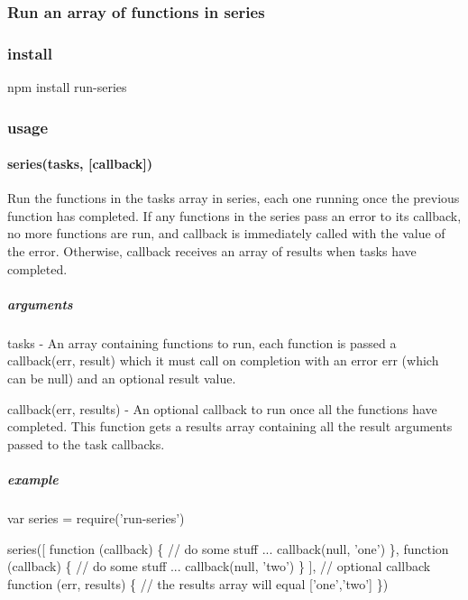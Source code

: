 \subsubsection*{Run an array of functions in series}

 \href{https://saucelabs.com/u/run-series}{\tt }

\subsubsection*{install}


\begin{DoxyCode}
npm install run-series
\end{DoxyCode}


\subsubsection*{usage}

\paragraph*{series(tasks, \mbox{[}callback\mbox{]})}

Run the functions in the {\ttfamily tasks} array in series, each one running once the previous function has completed. If any functions in the series pass an error to its callback, no more functions are run, and {\ttfamily callback} is immediately called with the value of the error. Otherwise, {\ttfamily callback} receives an array of results when {\ttfamily tasks} have completed.

\subparagraph*{arguments}


\begin{DoxyItemize}
\item {\ttfamily tasks} -\/ An array containing functions to run, each function is passed a {\ttfamily callback(err, result)} which it must call on completion with an error {\ttfamily err} (which can be {\ttfamily null}) and an optional result value.
\item {\ttfamily callback(err, results)} -\/ An optional callback to run once all the functions have completed. This function gets a results array containing all the result arguments passed to the task callbacks.
\end{DoxyItemize}

\subparagraph*{example}


\begin{DoxyCode}
var series = require('run-series')

series([
  function (callback) \{
    // do some stuff ...
    callback(null, 'one')
  \},
  function (callback) \{
    // do some stuff ...
    callback(null, 'two')
  \}
],
// optional callback
function (err, results) \{
  // the results array will equal ['one','two']
\})
\end{DoxyCode}


